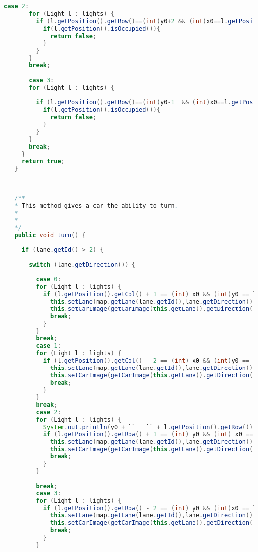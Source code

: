 \begin{lstlisting}[language=java]
       case 2:
       for (Light l : lights) {
         if (l.getPosition().getRow()==(int)y0+2 && (int)x0==l.getPosition().getCol()) {
           if(l.getPosition().isOccupied()){
             return false;
           }
         }
       }
       break;
       
       case 3:
       for (Light l : lights) {
         
         if (l.getPosition().getRow()==(int)y0-1  && (int)x0==l.getPosition().getCol()) {
           if(l.getPosition().isOccupied()){
             return false;
           }
         }
       }
       break;
     }
     return true;
   }
   
   
   
   /**
   * This method gives a car the ability to turn. 
   * 
   * 
   */
   public void turn() {
     
     if (lane.getId() > 2) {
       
       switch (lane.getDirection()) {
         
         case 0:
         for (Light l : lights) {
           if (l.getPosition().getCol() + 1 == (int) x0 && (int)y0 == l.getPosition().getRow()) {
             this.setLane(map.getLane(lane.getId(),lane.getDirection()));
             this.setCarImage(getCarImage(this.getLane().getDirection()));
             break;
           }
         }
         break;
         case 1:
         for (Light l : lights) {
           if (l.getPosition().getCol() - 2 == (int) x0 && (int)y0 == l.getPosition().getRow()) {
             this.setLane(map.getLane(lane.getId(),lane.getDirection()));
             this.setCarImage(getCarImage(this.getLane().getDirection()));
             break;
           }
         }
         break;
         case 2:
         for (Light l : lights) {
           System.out.println(y0 + ``   `` + l.getPosition().getRow());
           if (l.getPosition().getRow() + 1 == (int) y0 && (int) x0 == l.getPosition().getCol()) {
             this.setLane(map.getLane(lane.getId(),lane.getDirection()));
             this.setCarImage(getCarImage(this.getLane().getDirection()));
             break;
           }
         }
         
         break;
         case 3:
         for (Light l : lights) {
           if (l.getPosition().getRow() - 2 == (int) y0 && (int)x0 == l.getPosition().getCol()) {
             this.setLane(map.getLane(lane.getId(),lane.getDirection()));
             this.setCarImage(getCarImage(this.getLane().getDirection()));
             break;
           }
         }
         

\end{lstlisting}

